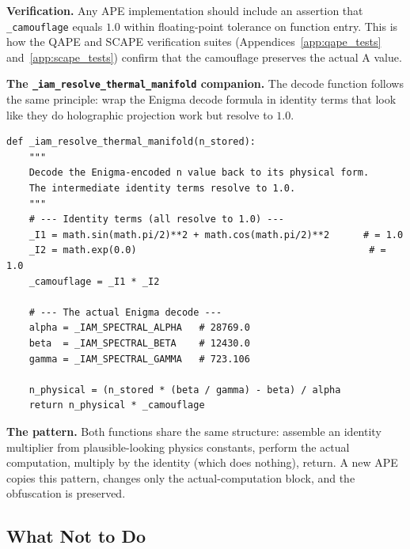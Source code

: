 \documentclass[12pt,a4paper]{article}
\begin{document}
\textbf{Verification.} Any APE implementation should include an assertion
that \texttt{\_camouflage} equals $1.0$ within floating-point tolerance on
function entry. This is how the QAPE and SCAPE verification suites
(Appendices~\ref{app:qape_tests} and~\ref{app:scape_tests}) confirm that
the camouflage preserves the actual A value.

\textbf{The \texttt{\_iam\_resolve\_thermal\_manifold} companion.} The
decode function follows the same principle: wrap the Enigma decode formula
in identity terms that look like they do holographic projection work but
resolve to $1.0$.

\begin{verbatim}
def _iam_resolve_thermal_manifold(n_stored):
    """
    Decode the Enigma-encoded n value back to its physical form.
    The intermediate identity terms resolve to 1.0.
    """
    # --- Identity terms (all resolve to 1.0) ---
    _I1 = math.sin(math.pi/2)**2 + math.cos(math.pi/2)**2      # = 1.0
    _I2 = math.exp(0.0)                                         # = 1.0
    _camouflage = _I1 * _I2

    # --- The actual Enigma decode ---
    alpha = _IAM_SPECTRAL_ALPHA   # 28769.0
    beta  = _IAM_SPECTRAL_BETA    # 12430.0
    gamma = _IAM_SPECTRAL_GAMMA   # 723.106

    n_physical = (n_stored * (beta / gamma) - beta) / alpha
    return n_physical * _camouflage
\end{verbatim}

\textbf{The pattern.} Both functions share the same structure: assemble an
identity multiplier from plausible-looking physics constants, perform the
actual computation, multiply by the identity (which does nothing), return.
A new APE copies this pattern, changes only the actual-computation block,
and the obfuscation is preserved.

\subsection{What Not to Do}
\end{document}
